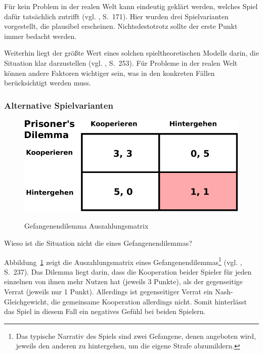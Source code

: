 Für kein Problem in der realen Welt kann eindeutig geklärt werden, welches Spiel dafür tatsächlich zutrifft
(vgl. \cite{Poundstone}, S.~171). Hier wurden drei Spielvarianten vorgestellt, die plausibel erscheinen. Nichtsdestotrotz sollte
der erste Punkt immer bedacht werden.

Weiterhin liegt der größte Wert eines solchen spieltheoretischen Modells darin, die Situation klar darzustellen
(vgl. \cite{Poundstone}, S.~253). Für Probleme in der realen Welt können andere Faktoren wichtiger sein, was in den
konkreten Fällen berücksichtigt werden muss.

\subsubsection{Alternative Spielvarianten}

\begin{figure}%
\centering
\caption{Gefangenendilemma Auszahlungsmatrix}
\includegraphics[scale=0.8]{Grafiken/Prisoner_Ink.pdf} 
\label{pic:Prisoner}
\end{figure}

Wieso ist die Situation nicht die eines Gefangenendilemmas?

Abbildung~\ref{pic:Prisoner} zeigt die Auszahlungsmatrix eines Gefangenendilemmas\footnote{
Das typische Narrativ des Spiels sind zwei Gefangene, denen angeboten wird, jeweils den anderen zu hintergehen,
um die eigene Strafe abzumildern.
} (vgl. \cite{Poundstone}, S.~237).
Das Dilemma liegt darin, dass die Kooperation beider Spieler für jeden einzelnen von ihnen mehr Nutzen hat (jeweils 3 Punkte),
als der gegenseitige Verrat (jeweils nur 1 Punkt). Allerdings ist gegenseitiger Verrat ein Nash-Gleichgewicht, die
gemeinsame Kooperation allerdings nicht. Somit hinterlässt das \grqq{} Spiel in diesem Fall ein negatives
Gefühl bei beiden Spielern.

